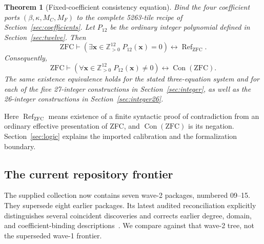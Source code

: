 \documentclass[11pt]{article}
\newcommand{\Pos}{\mathbb Z_{>0}}
\newcommand{\Con}{\operatorname{Con}}
\newcommand{\ZFCRef}{\operatorname{Ref}_{\mathrm{ZFC}}}
\newtheorem{theorem}{Theorem}[section]
\theoremstyle{remark}\newtheorem{remark}[theorem]{Remark}
\begin{document}
\begin{theorem}[Fixed-coefficient consistency equation]\label{thm:main}
Bind the four coefficient ports $(\beta,\kappa,M_C,M_F)$ to the complete
5263-tile recipe of Section~\ref{sec:coefficients}. Let $P_{12}$ be the
ordinary integer polynomial defined in Section~\ref{sec:twelve}. Then
\[
 \mathrm{ZFC}\vdash
 \left(\exists\mathbf x\in\Pos^{12}\;P_{12}(\mathbf x)=0\right)
 \longleftrightarrow \ZFCRef.
\]
Consequently,
\[
 \boxed{\quad\mathrm{ZFC}\vdash
 \left(\forall\mathbf x\in\Pos^{12}\;P_{12}(\mathbf x)\ne0\right)
 \longleftrightarrow\Con(\mathrm{ZFC}).\quad}
\]
The same existence equivalence holds for the stated three-equation system
and for each of the five 27-integer constructions in Section~\ref{sec:integer},
as well as the 26-integer constructions in Section~\ref{sec:integer26}.
\end{theorem}

Here $\ZFCRef$ means existence of a finite syntactic proof of contradiction from
an ordinary effective presentation of ZFC, and $\Con(\mathrm{ZFC})$ is its
negation. Section~\ref{sec:logic} explains the imported calibration and the
formalization boundary.

\subsection{The current repository frontier}

The supplied collection now contains seven wave-2 packages, numbered 09--15.
They supersede eight earlier packages. Its latest audited reconciliation
explicitly distinguishes several coincident discoveries and corrects earlier
degree, domain, and coefficient-binding descriptions~\cite{catalogue}.
We compare against that wave-2 tree, not the superseded wave-1 frontier.
\end{document}
